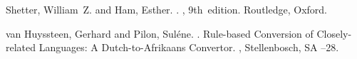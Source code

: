\documentclass[11pt]{article}
\begin{document}
\begin{thebibliography}{}
Shetter, William~Z. and Ham, Esther.
.
, 9th~edition.
\newblock Routledge, Oxford.

van Huyssteen, Gerhard and Pilon, Suléne.
. 
\newblock Rule-based Conversion of Closely-related Languages: A Dutch-to-Afrikaans Convertor. 
, Stellenbosch, SA
--28.



\end{thebibliography}
\end{document}
